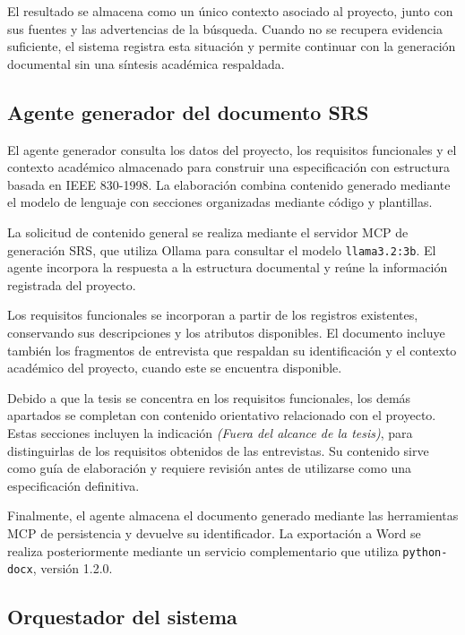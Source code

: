 El resultado se almacena como un único contexto
asociado al proyecto, junto con sus fuentes y las
advertencias de la búsqueda. Cuando no se recupera
evidencia suficiente, el sistema registra esta situación
y permite continuar con la generación documental
sin una síntesis académica respaldada.

\subsection{Agente generador del documento SRS}
\label{subsec:agente-generador-srs}

El agente generador consulta los datos del proyecto,
los requisitos funcionales y el contexto académico
almacenado para construir una especificación con
estructura basada en IEEE 830-1998. La elaboración
combina contenido generado mediante el modelo de lenguaje
con secciones organizadas mediante código y plantillas.

La solicitud de contenido general se realiza mediante
el servidor MCP de generación SRS, que utiliza Ollama
para consultar el modelo \texttt{llama3.2:3b}.
El agente incorpora la respuesta a la estructura
documental y reúne la información registrada
del proyecto.

Los requisitos funcionales se incorporan a partir de
los registros existentes, conservando sus descripciones
y los atributos disponibles. El documento incluye
también los fragmentos de entrevista que respaldan
su identificación y el contexto académico del proyecto,
cuando este se encuentra disponible.

Debido a que la tesis se concentra en los requisitos
funcionales, los demás apartados se completan con
contenido orientativo relacionado con el proyecto.
Estas secciones incluyen la indicación
\textit{(Fuera del alcance de la tesis)}, para distinguirlas
de los requisitos obtenidos de las entrevistas.
Su contenido sirve como guía de elaboración y requiere
revisión antes de utilizarse como una especificación
definitiva.

Finalmente, el agente almacena el documento generado
mediante las herramientas MCP de persistencia y devuelve
su identificador. La exportación a Word se realiza
posteriormente mediante un servicio complementario
que utiliza \texttt{python-docx}, versión 1.2.0.

\subsection{Orquestador del sistema}
\label{subsec:orquestador-sistema}

